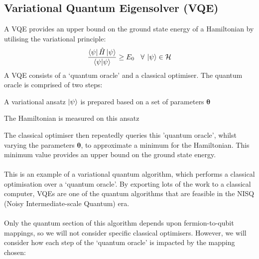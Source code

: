 \documentclass[twoside]{article}
\begin{document}
\subsection{Variational Quantum Eigensolver (VQE)}\label{vqe_section}
A VQE provides an upper bound on the ground state energy of a Hamiltonian by utilising the variational principle:
\begin{equation}
        \frac{\bra{\psi} \hat H \ket{\psi}}{\braket{\psi | \psi}} \geq E_0 \>\>\>\> \forall \> \ket{\psi}\in \mathcal{H}
\end{equation}
A VQE consists of a `quantum oracle' and a classical optimiser. The quantum oracle is comprised of two steps:
\begin{romanlist}
\item A variational ansatz $\ket{\psi}$ is prepared based on a set of parameters $\bm \theta$
\item The Hamiltonian is measured on this ansatz 
\end{romanlist}
The classical optimiser then repeatedly queries this 'quantum oracle', whilst varying the parameters $\bm \theta$, to approximate a minimum for the Hamiltonian. This minimum value provides an upper bound on the ground state energy.\\\\
This is an example of a variational quantum algorithm, which performs a classical optimisation over a `quantum oracle'. By exporting lots of the work to a classical computer, VQEs are one of the quantum algorithms that are feasible in the NISQ (Noisy Intermediate-scale Quantum) era.\\\\
Only the quantum section of this algorithm depends upon fermion-to-qubit mappings, so we will not consider specific classical optimisers. However, we will consider how each step of the `quantum oracle' is impacted by the mapping chosen:
\end{document}
